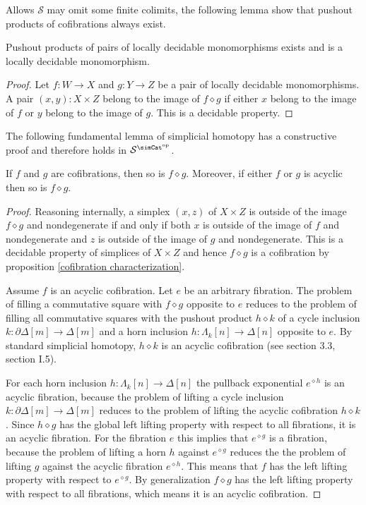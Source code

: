 \documentclass{tac}
\newcommand\cat\mathcal
\newcommand\dual{^{\mathrm{op}}}
\newcommand\s{^{\simCat\dual}}
\newcommand\of{:}
\newcommand\simplex\Delta
\newcommand\cycle{\partial\Delta}
\newcommand\horn\Lambda
\newcommand\pe[1]{^{\diamond #1}}
\newcommand\pp{\mathbin\diamond}
\begin{document}
Allows $\cat S$ may omit some finite colimits, the following lemma show that pushout products of cofibrations always exist.

\begin{lemma} Pushout products of pairs of locally decidable monomorphisms exists and is a locally decidable monomorphism. \end{lemma}

\begin{proof} Let $f\of W\to X$ and $g\of Y\to Z$ be a pair of locally decidable monomorphisms. A pair $(x,y)\of X\times Z$ belong to the image of $f\pp g$ if either $x$ belong to the image of $f$ or $y$ belong to the image of $g$. This is a decidable property.
\end{proof}

The following fundamental lemma of simplicial homotopy has a constructive proof and therefore holds in $\cat S\s$.

\begin{lemma} If $f$ and $g$ are cofibrations, then so is $f\pp g$. Moreover, if either $f$ or $g$ is acyclic then so is $f\pp g$. \label{pushout product} \end{lemma}

\begin{proof} Reasoning internally, a simplex $(x,z)$ of $X\times Z$ is outside of the image $f\pp g$ and nondegenerate if and only if both $x$ is outside of the image of $f$ and nondegenerate and $z$ is outside of the image of $g$ and nondegenerate. This is a decidable property of simplices of $X\times Z$ and hence $f\pp g$ is a cofibration by proposition \ref{cofibration characterization}. 

Assume $f$ is an acyclic cofibration. Let $e$ be an arbitrary fibration. The problem of filling a commutative square with $f\pp g$ opposite to $e$ reduces to the problem of filling all commutative squares with the pushout product $h\pp k$ of a cycle inclusion $k\of \cycle[m]\to \simplex[m]$ and a horn inclusion $h\of \horn_k[n]\to\simplex[n]$ opposite to $e$. By standard simplicial homotopy, $h\pp k$ is an acyclic cofibration (see \cite{Hovey99} section 3.3, \cite{GJSHT} section I.5).

For each horn inclusion $h\of \horn_k[n]\to \simplex[n]$ the pullback exponential $e\pe h$ is an acyclic fibration, because the problem of lifting a cycle inclusion $k\of \cycle[m]\to \simplex[m]$ reduces to the problem of lifting the acyclic cofibration $h\pp k$. Since $h\pp g$ has the global left lifting property with respect to all fibrations, it is an acyclic fibration. For the fibration $e$ this implies that $e\pe g$ is a fibration, because the problem of lifting a horn $h$ against $e\pe g$ reduces the the problem of lifting $g$ against the acyclic fibration $e\pe h$. This means that $f$ has the left lifting property with respect to $e\pe g$. By generalization $f\pp g$ has the left lifting property with respect to all fibrations, which means it is an acyclic cofibration.
\end{proof}
\end{document}
